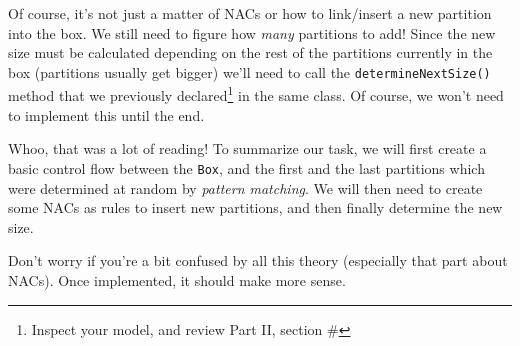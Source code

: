 \vfill
\newpage

Of course, it's not just a matter of NACs or how to link/insert a new partition into the box. We still need to figure how \emph{many} partitions to add! Since
the new size must be calculated depending on the rest of the partitions currently in the box (partitions usually get bigger) we'll need to call the
\texttt{determineNextSize()} method that we previously declared\footnote{Inspect your model, and review Part II, section \#} in the same class. Of course, we 
won't need to implement this until the end.

Whoo, that was a lot of reading! To summarize our task, we will first create a basic control flow between the \texttt{Box}, and the first and the last
partitions which were determined at random by \emph{pattern matching}. We will then need to create some NACs as rules to insert new partitions, and then 
finally determine the new size.

Don't worry if you're a bit confused by all this theory (especially that part about \mbox{NAC}s). Once implemented, it should make more sense.





